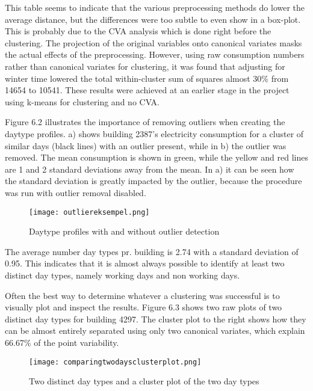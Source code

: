 This table seems to indicate that the various preprocessing methods do lower the average distance, but the differences were too subtle to even show in a box-plot. This is probably due to the CVA analysis which is done right before the clustering. The projection of the original variables onto canonical variates masks the actual effects of the preprocessing. However, using raw consumption numbers rather than canonical variates for clustering, it was found that adjusting for winter time lowered the total within-cluster sum of squares almost 30\% from 14654 to 10541. These results were achieved at an earlier stage in the project using k-means for clustering and no CVA.

Figure 6.2 illustrates the importance of removing outliers when creating the daytype profiles. a) shows building 2387’s electricity consumption for a cluster of similar days (black lines) with an outlier present, while in b) the outlier was removed. The mean consumption is shown in green, while the yellow and red lines are 1 and 2 standard deviations away from the mean. In a) it can be seen how the standard deviation is greatly impacted by the outlier, because the procedure was run with outlier removal disabled.
\begin{figure}
\begin{center}
\texttt{[image: outliereksempel.png]}
\end{center}
\caption{Daytype profiles with and without outlier detection}
\end{figure}

The average number day types pr. building is 2.74 with a standard deviation of 0.95. This indicates that it is almost always possible to identify at least two distinct day types, namely working days and non working days. 

Often the best way to determine whatever a clustering was successful is to visually plot and inspect the results. Figure 6.3 shows two raw plots of two distinct day types for building 4297. The cluster plot to the right shows how they can be almost entirely separated using only two canonical variates, which explain 66.67\% of the point variability.
\begin{figure}
\begin{center}
\texttt{[image: comparingtwodaysclusterplot.png]}
\end{center}
\caption{Two distinct day types and a cluster plot of the two day types}
\end{figure}

